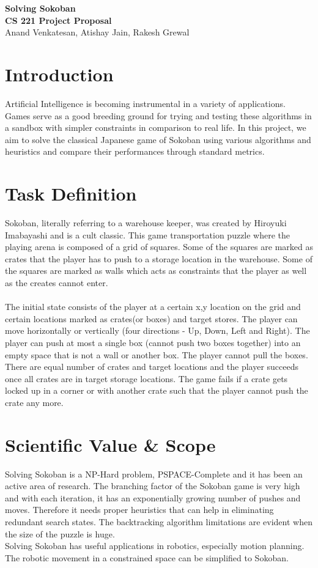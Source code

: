 \documentclass[10pt, final]{article}
\begin{document}
	
	\begin{center}
		\LARGE{\textbf{Solving Sokoban}}\\
		\Large{\textbf{CS 221 Project Proposal}}\\
		\Large{Anand Venkatesan, Atishay Jain, Rakesh Grewal }
	\end{center}
	
	\section{Introduction}
	Artificial Intelligence is becoming instrumental in a variety of applications. Games serve as a good breeding ground for trying and testing these algorithms in a sandbox with simpler constraints in comparison to real life. In this project, we aim to solve the classical Japanese game of Sokoban using various algorithms and heuristics and compare their performances through standard metrics.  
	
	\section{Task Definition}
	Sokoban, literally referring to a warehouse keeper, was created by Hiroyuki Imabayashi and is a cult classic. This game transportation puzzle where the playing arena is composed of a grid of squares. Some of the squares are marked as crates that the player has to push to a storage location in the warehouse. Some of the squares are marked as walls which acts as constraints that the player as well as the creates cannot enter. \\
	\\
	The initial state consists of the player at a certain x,y location on the grid and certain locations marked as crates(or boxes) and target stores. The player can move horizontally or vertically (four directions - Up, Down, Left and Right). The player can push at most a single box (cannot push two boxes together) into an empty space that is not a wall or another box. The player cannot pull the boxes. There are equal number of crates and target locations and the player succeeds once all crates are in target storage locations. The game fails if a crate gets locked up in a corner or with another crate such that the player cannot push the crate any more.
	
	\section{Scientific Value \& Scope}
	Solving Sokoban is a NP-Hard problem, PSPACE-Complete\cite{1} and it has been an active area of research. The branching factor of the Sokoban game is very high and with each iteration, it has an exponentially growing number of pushes and moves. Therefore it needs proper heuristics that can help in eliminating redundant search states. The backtracking algorithm limitations are evident when the size of the puzzle is huge. \\
	Solving Sokoban has useful applications in robotics, especially motion planning. The robotic movement in a constrained space can be simplified to Sokoban.
	
\end{document}
